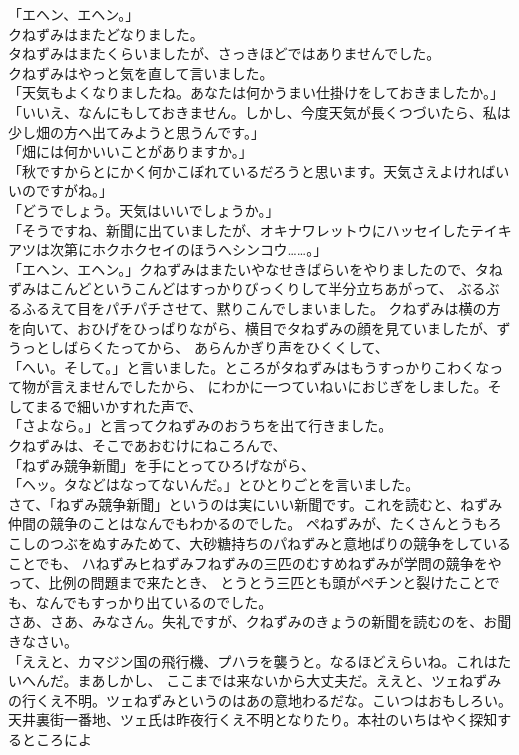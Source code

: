 \documentclass[
a4paper,
10pt,
book]
{tarticle}
\begin{document}
「エヘン、エヘン。」\\
\indent クねずみはまたどなりました。\\
\indent タねずみはまたくらいましたが、さっきほどではありませんでした。\\
\indent クねずみはやっと気を直して言いました。\\
「天気もよくなりましたね。あなたは何かうまい仕掛けをしておきましたか。」\\
「いいえ、なんにもしておきません。しかし、今度天気が長くつづいたら、私は少し畑の方へ出てみようと思うんです。」\\
「畑には何かいいことがありますか。」\\
「秋ですからとにかく何かこぼれているだろうと思います。天気さえよければいいのですがね。」\\
「どうでしょう。天気はいいでしょうか。」\\
「そうですね、新聞に出ていましたが、オキナワレットウにハッセイしたテイキアツは次第にホクホクセイのほうへシンコウ……。」\\
「エヘン、エヘン。」クねずみはまたいやなせきばらいをやりましたので、タねずみはこんどというこんどはすっかりびっくりして半分立ちあがって、
ぶるぶるふるえて目をパチパチさせて、黙りこんでしまいました。
\newpage
\thispagestyle{fancy}
\fancyhead[R]{\empty}
\indent クねずみは横の方を向いて、おひげをひっぱりながら、横目でタねずみの顔を見ていましたが、ずうっとしばらくたってから、
あらんかぎり声をひくくして、\\
「へい。そして。」と言いました。ところがタねずみはもうすっかりこわくなって物が言えませんでしたから、
にわかに一つていねいにおじぎをしました。そしてまるで細いかすれた声で、\\
「さよなら。」と言ってクねずみのおうちを出て行きました。\\
\indent クねずみは、そこであおむけにねころんで、\\
「ねずみ競争新聞」を手にとってひろげながら、\\
「ヘッ。タなどはなってないんだ。」とひとりごとを言いました。\\
\indent さて、「ねずみ競争新聞」というのは実にいい新聞です。これを読むと、ねずみ仲間の競争のことはなんでもわかるのでした。
ペねずみが、たくさんとうもろこしのつぶをぬすみためて、大砂糖持ちのパねずみと意地ばりの競争をしていることでも、
ハねずみヒねずみフねずみの三匹のむすめねずみが学問の競争をやって、比例の問題まで来たとき、
とうとう三匹とも頭がペチンと裂けたことでも、なんでもすっかり出ているのでした。\\
\indent さあ、さあ、みなさん。失礼ですが、クねずみのきょうの新聞を読むのを、お聞きなさい。\\
「ええと、カマジン国の飛行機、プハラを襲うと。なるほどえらいね。これはたいへんだ。まあしかし、
ここまでは来ないから大丈夫だ。ええと、ツェねずみの行くえ不明。ツェねずみというのはあの意地わるだな。こいつはおもしろい。\\
\indent 天井裏街一番地、ツェ氏は昨夜行くえ不明となりたり。本社のいちはやく探知するところによ
\end{document}

